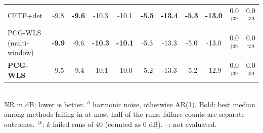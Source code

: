 \begin{table}[t]
{\begin{tabular}{lcccccccccc}
CFTF+det & -9.8 & \textbf{-9.6} & -10.3 & -10.1 & \textbf{-5.5} & \textbf{-13.4} & \textbf{-5.3} & \textbf{-13.0} & 0.0$^{\dagger39}$ & 0.0$^{\dagger39}$ \\
PCG-WLS (multi-window) & \textbf{-9.9} & -9.6 & \textbf{-10.3} & \textbf{-10.1} & -5.3 & -13.3 & -5.0 & -13.0 & 0.0$^{\dagger39}$ & 0.0$^{\dagger39}$ \\
\textbf{PCG-WLS} & -9.5 & -9.4 & -10.1 & -10.0 & -5.2 & -13.3 & -5.2 & -12.9 & 0.0$^{\dagger39}$ & 0.0$^{\dagger39}$ \\
\bottomrule
\end{tabular}}
\\[2pt]{\scriptsize NR in dB; lower is better. $^h$ harmonic noise, otherwise AR(1). Bold: best median among methods failing in at most half of the runs; failure counts are separate outcomes. $^{\dagger k}$: $k$ failed runs of 40 (counted as 0 dB). --: not evaluated.}
\end{table}
